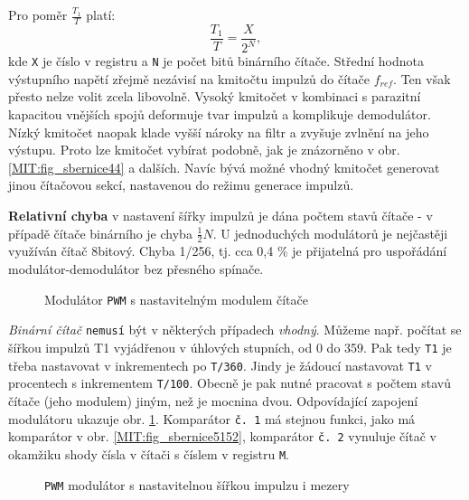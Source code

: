     Pro poměr \(\frac{T_1}{T}\) platí:
    \begin{equation*}
      \frac{T_1}{T} = \frac{X}{2^N},
    \end{equation*}
    kde \texttt{X} je číslo v registru a \texttt{N} je počet bitů binárního čítače. Střední hodnota 
    výstupního napětí zřejmě nezávisí na kmitočtu impulzů do čítače \(f_{ref}\). Ten však přesto 
    nelze volit zcela libovolně. Vysoký kmitočet v kombinaci s parazitní kapacitou vnějších spojů 
    deformuje tvar impulzů a komplikuje demodulátor. Nízký kmitočet naopak klade vyšší nároky na 
    filtr a zvyšuje zvlnění na jeho výstupu. Proto lze kmitočet vybírat podobně, jak je znázorněno 
    v obr. \ref{MIT:fig_sbernice44} a dalších.  Navíc bývá možné vhodný kmitočet generovat jinou 
    čítačovou sekcí, nastavenou do režimu generace impulzů.

    \textbf{Relativní chyba} v nastavení šířky impulzů je dána počtem stavů čítače - v případě 
    čítače binárního je chyba \(\frac{1}{2}N\). U jednoduchých modulátorů je nejčastěji využíván 
    čítač 8bitový. Chyba 1/256, tj. cca 0,4 \% je přijatelná pro uspořádání modulátor-demodulátor 
    bez přesného spínače. 
    
    \begin{figure}[ht!]
      \centering  
      \caption{Modulátor \texttt{PWM} s nastavitelným modulem čítače}
      \label{MIT:fig_sbernice5354}
    \end{figure}
    
    \emph{Binární čítač} \texttt{nemusí} být v některých případech \emph{vhodný}. Můžeme např. 
    počítat se šířkou impulzů T1 vyjádřenou v úhlových stupních, od 0 do 359. Pak tedy \texttt{T1} 
    je třeba nastavovat v inkrementech po \texttt{T/360}. Jindy je žádoucí nastavovat \texttt{T1} v 
    procentech s inkrementem \texttt{T/100}. Obecně je pak nutné pracovat s počtem stavů čítače 
    (jeho modulem) jiným, než je mocnina dvou. Odpovídající zapojení modulátoru ukazuje obr. 
    \ref{MIT:fig_sbernice5354}. Komparátor \texttt{č. 1} má stejnou funkci, jako má komparátor v 
    obr. \ref{MIT:fig_sbernice5152}, komparátor \texttt{č. 2} vynuluje čítač v okamžiku shody čísla 
    v čítači s číslem v registru \texttt{M}.    
    
    \begin{figure}[ht!]
      \centering  
      \caption{\texttt{PWM} modulátor s nastavitelnou šířkou impulzu i mezery}
      \label{MIT:fig_sbernice5556}
    \end{figure}
    
